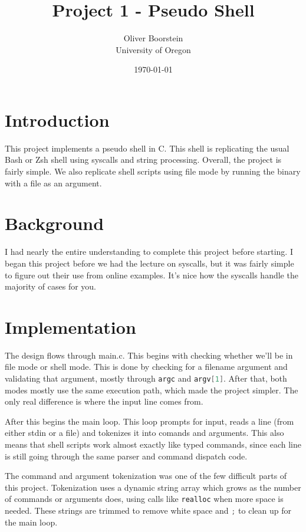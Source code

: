 \documentclass[12pt]{article}
\title{Project 1 - Pseudo Shell}
\author{Oliver Boorstein \\ University of Oregon}
\date{\today}
\begin{document}
\maketitle
\pagebreak

\section{Introduction}
This project implements a pseudo shell in C. This shell is replicating the usual Bash or Zsh shell using syscalls and string processing. Overall, the project is fairly simple. We also replicate shell scripts using file mode by running the binary with a file as an argument.

\section{Background}
I had nearly the entire understanding to complete this project before starting. I began this project before we had the lecture on syscalls, but it was fairly simple to figure out their use from online examples. It's nice how the syscalls handle the majority of cases for you.

\section{Implementation}
The design flows through main.c. This begins with checking whether we'll be in file mode or shell mode. This is done by checking for a filename argument and validating that argument, mostly through \lstinline[language=C]|argc| and \lstinline[language=C]|argv[1]|. After that, both modes mostly use the same execution path, which made the project simpler. The only real difference is where the input line comes from.

After this begins the main loop. This loop prompts for input, reads a line (from either stdin or a file) and tokenizes it into comands and arguments. This also means that shell scripts work almost exactly like typed commands, since each line is still going through the same parser and command dispatch code.

The command and argument tokenization was one of the few difficult parts of this project. Tokenization uses a dynamic string array which grows as the number of commands or arguments does, using calls like \lstinline[language=C]|realloc| when more space is needed. These strings are trimmed to remove white space and \lstinline[language=C]|;| to clean up for the main loop.
\end{document}
